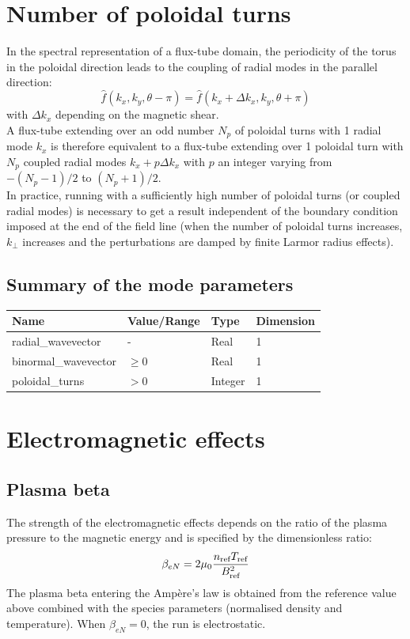 \documentclass[a4paper]{report}
\begin{document}
\section{Number of poloidal turns}
In the spectral representation of a flux-tube domain, the periodicity of the torus in the poloidal direction leads to the coupling of radial modes in the parallel direction:
$$\hat{f}(k_x,k_y,\theta-\pi)=\hat{f}(k_x+\Delta k_x,k_y,\theta+\pi)$$
with $\Delta k_x$ depending on the magnetic shear.\\
A flux-tube extending over an odd number $N_p$ of poloidal turns with 1 radial mode $k_x$ is therefore equivalent to a flux-tube extending over 1 poloidal turn with $N_p$ coupled radial modes $k_x + p\Delta k_x$ with $p$ an integer varying from $-(N_p-1)/2$ to $(N_p+1)/2$.\\ 
In practice, running with a sufficiently high number of poloidal turns (or coupled radial modes) is necessary to get a result independent of the boundary condition imposed at the end of the field line (when the number of poloidal turns increases, $k_\perp$ increases and the perturbations are damped by finite Larmor radius effects). 

\subsection{Summary of the mode parameters}
\begin{tabularx}{\textwidth}{|X|Y|Y|Y|}
\hline
Name & Value/Range & Type & Dimension \\
\hline
radial\_wavevector & - & Real & 1 \\
binormal\_wavevector & $\geq 0$ & Real & 1 \\
poloidal\_turns & $>0$ & Integer & 1 \\
\hline
\end{tabularx}

\section{Electromagnetic effects}
\subsection{Plasma beta}
The strength of the electromagnetic effects depends on the ratio of the plasma pressure to the magnetic energy and is specified by the dimensionless ratio:
\begin{equation}
\beta_{eN} = 2\mu_0 \frac{n_{\textrm{ref}} T_{\textrm{ref}}}{B_{\textrm{ref}}^2}
\end{equation}
The plasma beta entering the Amp\`ere's law is obtained from the reference value above combined with the species parameters (normalised density and temperature).
When $\beta_{eN}=0$, the run is electrostatic. 
\end{document}
